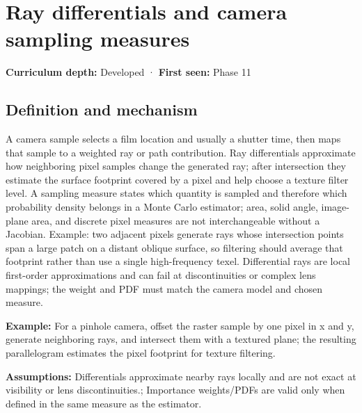 \hypertarget{appendix-8c40fad29462}{}\label{referencestart:appendix-8c40fad29462}
\section{Ray differentials and camera sampling measures}\label{appendix-8c40fad29462-ray-differentials-and-camera-sampling-measures}

\hypertarget{appendix-8c40fad29462-ray-differentials-and-camera-sampling-measures}{}

\textbf{Curriculum depth:} Developed · \textbf{First seen:} Phase 11

\begin{allmightroledefinition}

\subsection{Definition and mechanism}\label{appendix-8c40fad29462-definition-and-mechanism}

\hypertarget{appendix-8c40fad29462-definition-and-mechanism}{}

A camera sample selects a film location and usually a shutter time, then maps that sample to a weighted ray or path contribution. Ray differentials approximate how neighboring pixel samples change the generated ray; after intersection they estimate the surface footprint covered by a pixel and help choose a texture filter level. A sampling measure states which quantity is sampled and therefore which probability density belongs in a Monte Carlo estimator; area, solid angle, image-plane area, and discrete pixel measures are not interchangeable without a Jacobian. Example: two adjacent pixels generate rays whose intersection points span a large patch on a distant oblique surface, so filtering should average that footprint rather than use a single high-frequency texel. Differential rays are local first-order approximations and can fail at discontinuities or complex lens mappings; the weight and PDF must match the camera model and chosen measure.

\end{allmightroledefinition}

\textbf{Example:} For a pinhole camera, offset the raster sample by one pixel in x and y, generate neighboring rays, and intersect them with a textured plane; the resulting parallelogram estimates the pixel footprint for texture filtering.

\textbf{Assumptions:} Differentials approximate nearby rays locally and are not exact at visibility or lens discontinuities.; Importance weights/PDFs are valid only when defined in the same measure as the estimator.


